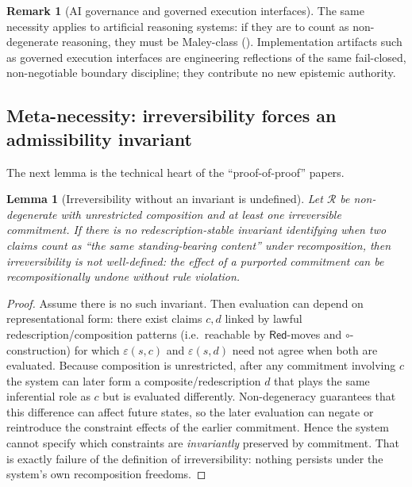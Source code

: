 \documentclass[11pt]{article}
\newtheorem{lemma}[theorem]{Lemma}
\theoremstyle{definition}
\newtheorem{remark}[theorem]{Remark}
\newcommand{\Red}{\mathsf{Red}}
\begin{document}
\begin{remark}[AI governance and governed execution interfaces]
The same necessity applies to artificial reasoning systems: if they are to count as non-degenerate reasoning, they must be Maley-class ().
Implementation artifacts such as governed execution interfaces are engineering reflections of the same fail-closed, non-negotiable boundary discipline; they contribute no new epistemic authority.
\end{remark}

\subsection{Meta-necessity: irreversibility forces an admissibility invariant}

The next lemma is the technical heart of the ``proof-of-proof'' papers.

\begin{lemma}[Irreversibility without an invariant is undefined]
\label{lem:irreversibility-undefined}
Let $\mathcal{R}$ be non-degenerate with unrestricted composition and at least one irreversible commitment.
If there is no redescription-stable invariant identifying when two claims count as ``the same standing-bearing content'' under recomposition, then \emph{irreversibility is not well-defined}: the effect of a purported commitment can be recompositionally undone without rule violation.
\end{lemma}

\begin{proof}
Assume there is no such invariant.
Then evaluation can depend on representational form: there exist claims $c,d$ linked by lawful redescription/composition patterns (i.e.\ reachable by $\Red$-moves and $\circ$-construction) for which $\varepsilon(s,c)$ and $\varepsilon(s,d)$ need not agree when both are evaluated.
Because composition is unrestricted, after any commitment involving $c$ the system can later form a composite/redescription $d$ that plays the same inferential role as $c$ but is evaluated differently.
Non-degeneracy guarantees that this difference can affect future states, so the later evaluation can negate or reintroduce the constraint effects of the earlier commitment.
Hence the system cannot specify which constraints are \emph{invariantly} preserved by commitment.
That is exactly failure of the definition of irreversibility: nothing persists under the system's own recomposition freedoms.
\end{proof}
\end{document}
